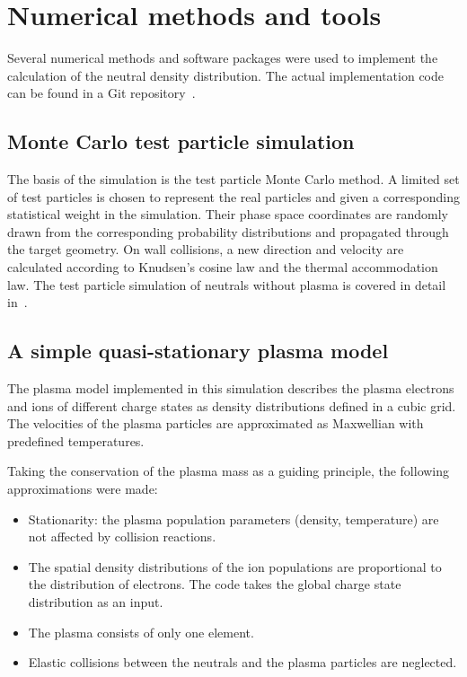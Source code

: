 \documentclass[a4paper,twoside,12pt]{article}
\begin{document}
\section{Numerical methods and tools}
Several numerical methods and software packages were used to implement the
calculation of the neutral density distribution. The actual implementation code
can be found in a Git repository~\cite{kapanen:git}.

\subsection{Monte Carlo test particle simulation}
The basis of the simulation is the test particle Monte Carlo method. A limited set of test particles is chosen to represent the real particles and given a corresponding statistical weight in the simulation. Their phase space coordinates are randomly drawn from the corresponding probability distributions and propagated through the target geometry. On wall collisions, a new direction and velocity are calculated according to Knudsen's cosine law and the thermal accommodation law. The test particle simulation of neutrals without plasma is covered in detail in~\cite{kapanen:bsc}.

\subsection{A simple quasi-stationary plasma model}
The plasma model implemented in this simulation describes the plasma electrons and ions of different charge states as density distributions defined in a cubic grid. The velocities of the plasma particles are approximated as Maxwellian with predefined temperatures.

Taking the conservation of the plasma mass as a guiding principle, the following approximations were made:
\begin{itemize}
    \item Stationarity: the plasma population parameters (density, temperature) are not affected by collision reactions.
    \item The spatial density distributions of the ion populations are
        proportional to the distribution of electrons. The code takes the
        global charge state distribution as an input.
    \item The plasma consists of only one element.
    \item Elastic collisions between the neutrals and the plasma particles are neglected.
\end{itemize}
\end{document}
